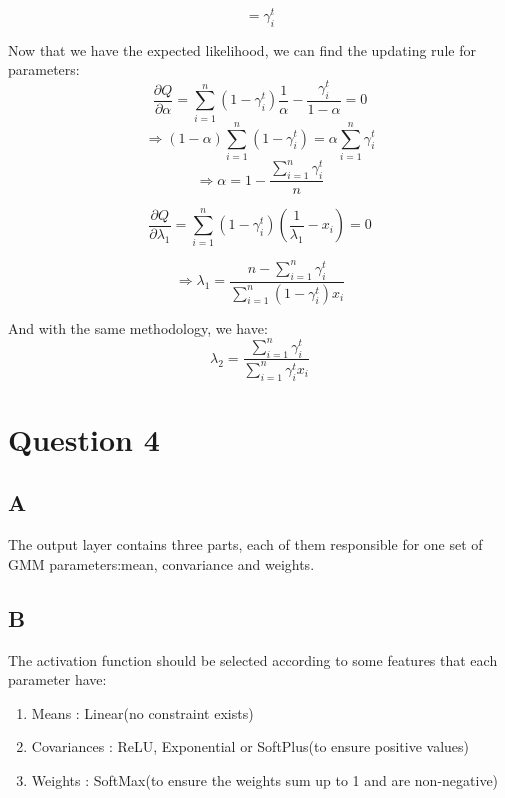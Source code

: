 \documentclass{article}
\begin{document}
\begin{equation*}
    = \gamma_i^t
\end{equation*}

Now that we have the expected likelihood, we can find the updating rule for parameters:
\begin{equation*}
    \frac{\partial Q}{\partial \alpha} = \sum_{i=1}^{n} (1-\gamma_i^t)\frac{1}{\alpha} - \frac{\gamma_i^t}{1-\alpha} = 0
\end{equation*}
\begin{equation*}
    \Rightarrow (1 - \alpha) \sum_{i=1}^{n}(1-\gamma_i^t) = \alpha \sum_{i=1}^{n} \gamma_i^t
\end{equation*}
\begin{equation*}
    \Rightarrow \alpha = 1 - \frac{\sum_{i=1}^{n} \gamma_i^t}{n}
\end{equation*}

\begin{equation*}
    \frac{\partial Q}{\partial \lambda_1} = \sum_{i=1}^{n}(1 - \gamma_i^t)(\frac{1}{\lambda_1} - x_i) = 0
\end{equation*}

\begin{equation*}
    \Rightarrow \lambda_1 = \frac{n - \sum_{i=1}^{n} \gamma_i^t}{\sum_{i=1}^{n}(1-\gamma_i^t)x_i}
\end{equation*}

And with the same methodology, we have:
\begin{equation*}
    \lambda_2 = \frac{\sum_{i=1}^{n} \gamma_i^t}{\sum_{i=1}^{n} \gamma_i^t x_i}
\end{equation*}


\section*{Question 4}

\subsection*{A}
The output layer contains three parts, each of them responsible for one set of GMM parameters:mean, convariance and weights.

\subsection*{B}
The activation function should be selected according to some features that each parameter have:

\begin{enumerate}
    \item Means : Linear(no constraint exists)
    \item Covariances : ReLU, Exponential or SoftPlus(to ensure positive values)
    \item Weights : SoftMax(to ensure the weights sum up to 1 and are non-negative)
\end{enumerate}
\end{document}

